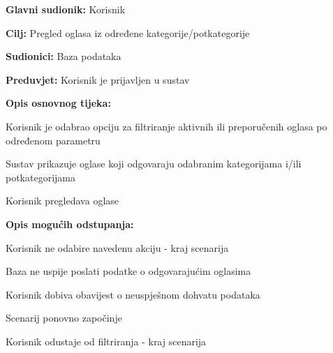 					\noindent {}
					\begin{packed_item}
	
						\item \textbf{Glavni sudionik: }Korisnik
						\item  \textbf{Cilj:} Pregled oglasa iz određene kategorije/potkategorije
						\item  \textbf{Sudionici:} Baza podataka
						\item  \textbf{Preduvjet:} Korisnik je prijavljen u sustav
						\item  \textbf{Opis osnovnog tijeka:}
						
						\item[] \begin{packed_enum}
							\item Korisnik je odabrao opciju za filtriranje aktivnih ili preporučenih oglasa po određenom parametru
							\item Sustav prikazuje oglase koji odgovaraju odabranim kategorijama i/ili potkategorijama
							\item Korisnik pregledava oglase
						\end{packed_enum}

						\item  \textbf{Opis mogućih odstupanja:}

						\item[] \begin{packed_item}
							\item[1.a] Korisnik ne odabire navedenu akciju - kraj scenarija
							\item[2.a] Baza ne uspije poslati podatke o odgovarajućim oglasima
							\item[] \begin{packed_enum}							
								\item Korisnik dobiva obavijest o neuspješnom dohvatu podataka
								\item
									\begin{packed_enum}
										\item Scenarij ponovno započinje
										\item Korisnik odustaje od filtriranja - kraj scenarija
									\end{packed_enum}			
							\end{packed_enum}	


\end{packed_item}
\end{packed_item}
